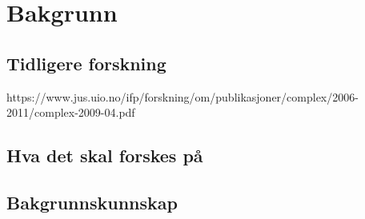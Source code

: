 \section{Bakgrunn}

\subsection{Tidligere forskning}

https://www.jus.uio.no/ifp/forskning/om/publikasjoner/complex/2006-2011/complex-2009-04.pdf

\subsection{Hva det skal forskes på}

\subsection{Bakgrunnskunnskap}

\newpage